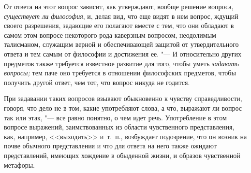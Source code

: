 От ответа на этот вопрос зависит, как утверждают, вообще решение вопроса,
{\em существует ли философия}, и, делая вид, что еще
видят в нем вопрос, ждущий своего разрешения, задающие его полагают вместе
с тем, что они обладают в самом этом вопросе некоторого рода каверзным
вопросом, неодолимым талисманом, служащим верной и обеспечивающей защитой
от утвердительного ответа и тем самым от философии и достижения ее. "--- И
относительно других предметов также требуется известное развитие для того,
чтобы уметь {\em задавать вопросы;} тем паче оно
требуется в отношении философских предметов, чтобы получить другой ответ,
чем тот, что вопрос никуда не годится.

При задавании таких вопросов взывают обыкновенно к чувству справедливости,
говоря, что дело не в том, какие употребляют слова, а что, выражают ли
вопрос так или этак, "--- все равно понятно, о чем идет речь. Употребление в
этом вопросе выражений, заимствованных из области чувственного
представления, как, например, <<выходить>> и~т.~п., возбуждает подозрение,
что он возник на почве обычного представления и что для ответа на него
также ожидают представлений, имеющих хождение в обыденной жизни, и образов
чувственной метафоры.

